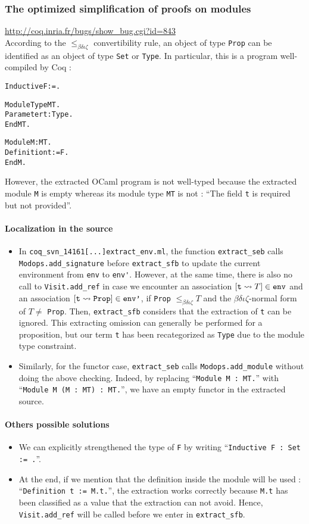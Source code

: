 \documentclass[a4paper, 11pt]{article}
\newenvironment{coq}
  {%
   \begin{alltt}
   \footnotesize} %% 8.3pl2 (April 2011)
  {\end{alltt} %
  }
\newcommand{\coqv}{14161}
\begin{document}
\subsubsection{The optimized simplification of proofs on modules}
\label{s:appendix_singl}
\url{http://coq.inria.fr/bugs/show_bug.cgi?id=843}\\
According to the $\leq_{\beta\delta\iota\zeta}$ convertibility rule, an object of type \verb|Prop| can be identified as an object of type \verb|Set| or \verb|Type|. In particular, this is a program well-compiled by Coq :
\begin{coq}
Inductive F := .

Module Type MT.
  Parameter t : Type.
End MT.

Module M : MT.
  Definition t := F.
End M.
\end{coq}
However, the extracted OCaml program is not well-typed because the extracted module \verb|M| is empty whereas its module type \verb|MT| is not : ``The field \verb|t| is required but not provided''.

\paragraph{Localization in the source}
\begin{itemize}
\item
In {\tt coq\_svn\_\coqv[...]extract\_env.ml}, the function \verb|extract_seb| calls \verb|Modops.add_signature| before \verb|extract_sfb| to update the current environment from \verb|env| to \verb|env'|. However, at the same time, there is also no call to \verb|Visit.add_ref| in case we encounter an association $[\verb|t| \leadsto T] \in \verb|env|$ and an association $[\verb|t| \leadsto \verb|Prop|] \in \verb|env'|$, if \verb|Prop| $\leq_{\beta\delta\iota\zeta} T$ and the $\beta\delta\iota\zeta$-normal form of $T \neq$ \verb|Prop|. Then, \verb|extract_sfb| considers that the extraction of \verb|t| can be ignored. This extracting omission can generally be performed for a proposition, but our term \verb|t| has been recategorized as \verb|Type| due to the module type constraint.
\item
Similarly, for the functor case, \verb|extract_seb| calls \verb|Modops.add_module| without doing the above checking. Indeed, by replacing ``\verb|Module M : MT.|'' with ``\verb|Module M (M : MT) : MT.|'', we have an empty functor in the extracted source.
\end{itemize}

\paragraph{Others possible solutions}
\begin{itemize}
\item
We can explicitly strengthened the type of \verb|F| by writing ``\verb|Inductive F : Set := .|''.
\item 
At the end, if we mention that the definition inside the module will be used : ``\verb|Definition t := M.t.|'', the extraction works correctly because \verb|M.t| has been classified as a value that the extraction can not avoid. Hence, \verb|Visit.add_ref| will be called before we enter in \verb|extract_sfb|.
\end{itemize}
\end{document}
